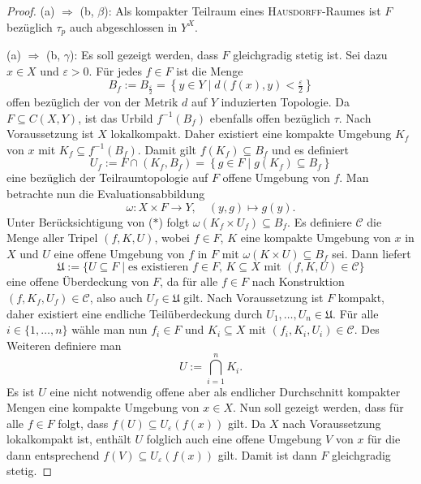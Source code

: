 \begin{proof}
  (a) $\Rightarrow$ (b, $\beta$):  
  Als kompakter Teilraum eines \textsc{Hausdorff}\hyp{}Raumes ist $F$ bezüglich $\tau_p$ auch abgeschlossen in $Y^X$.

  (a) $\Rightarrow$ (b, $\gamma$):
  Es soll gezeigt werden, dass $F$ gleichgradig stetig ist.
  Sei dazu $x \in X$ und $\varepsilon > 0$.
  Für jedes $f \in F$ ist die Menge
  \begin{displaymath}
    B_f := B_{\frac{\varepsilon}{2}} = \left\{ y \in Y \mid d(f(x),y) < \tfrac{\varepsilon}{2}\right\} 
  \end{displaymath}
  offen bezüglich der von der Metrik $d$ auf $Y$ induzierten Topologie.
  Da $F \subseteq C(X,Y)$, ist das Urbild $f^{-1}(B_f)$ ebenfalls offen bezüglich $\tau$.
  Nach Voraussetzung ist $X$ lokalkompakt.
  Daher existiert eine kompakte Umgebung $K_f$ von $x$ mit $K_f \subseteq f^{-1}(B_f)$.
  Damit gilt $f(K_f) \subseteq B_f$ und es definiert
  \begin{displaymath}
    U_f := F \cap (K_f, B_f) = \left\{g \in F \mid g(K_f) \subseteq B_f \right\} \tag{$\ast$}
  \end{displaymath}
  eine bezüglich der Teilraumtopologie auf $F$ offene Umgebung von $f$.
  Man betrachte nun die Evaluationsabbildung 
  \begin{displaymath}
    \omega: X \times F \to Y, \quad (y,g) \mapsto g(y).
  \end{displaymath}
  Unter Berücksichtigung von ($\ast$) folgt $\omega(K_f \times U_f) \subseteq B_f$.
  Es definiere $\mathcal{C}$ die Menge aller Tripel $(f,K,U)$, wobei $f \in F$, $K$ eine kompakte Umgebung von $x$ in $X$ und $U$ eine offene Umgebung von $f$ in $F$ mit $\omega(K \times U) \subseteq B_f$ sei.
  Dann liefert
  \begin{displaymath}
    \mathfrak{U} := \{ U \subseteq F \mid \text{es existieren $f \in F$, $K \subseteq X$ mit $(f,K,U) \in \mathcal C$} \}
  \end{displaymath}
  eine offene Überdeckung von $F$, da für alle $f \in F$ nach Konstruktion $(f,K_f,U_f) \in \mathcal{C}$, also auch $U_f \in \mathfrak{U}$ gilt.
  Nach Voraussetzung ist $F$ kompakt, daher existiert eine endliche Teilüberdeckung durch $U_1,\dots,U_n \in \mathfrak{U}$.
  Für alle $i \in \{ 1,\dots,n\}$ wähle man nun $f_i \in F$ und $K_i \subseteq X$ mit $(f_i, K_i, U_i) \in \mathcal{C}$.
  Des Weiteren definiere man 
  \begin{displaymath}
    U := \bigcap_{i = 1}^n K_i.
  \end{displaymath}
  Es ist $U$ eine nicht notwendig offene aber als endlicher Durchschnitt kompakter Mengen eine kompakte Umgebung von $x \in X$.
  Nun soll gezeigt werden, dass für alle $f \in F$ folgt, dass $f(U) \subseteq U_\varepsilon(f(x))$ gilt.
  Da $X$ nach Voraussetzung lokalkompakt ist, enthält $U$ folglich auch eine offene Umgebung $V$ von $x$ für die dann entsprechend $f(V) \subseteq U_\varepsilon(f(x))$ gilt.
  Damit ist dann $F$ gleichgradig stetig.


\end{proof}
